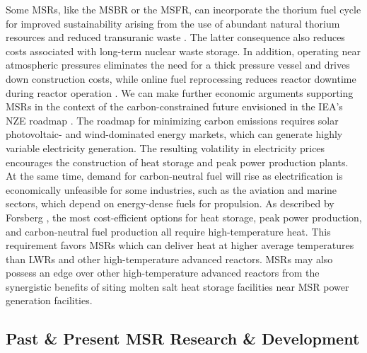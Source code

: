 Some \glspl{MSR}, like the \gls{MSBR} or the \gls{MSFR}, can
incorporate the thorium fuel cycle for improved sustainability arising from the
use of abundant natural thorium resources and reduced transuranic waste
\cite{heuer_towards_2014}. The latter consequence also reduces costs
associated with long-term nuclear waste storage. In addition, operating
near atmospheric pressures eliminates the need for a thick pressure
vessel and drives down construction costs, while online fuel reprocessing
reduces reactor downtime during reactor operation \cite{dolan_1_2017}.
We can make further economic arguments supporting \glspl{MSR} in the context of the
carbon-constrained future envisioned in the \gls{IEA}'s \gls{NZE} roadmap
\cite{iea_net_2021}. The roadmap for minimizing carbon emissions requires solar photovoltaic- and
wind-dominated energy markets, which can generate highly variable electricity generation. The
resulting volatility in electricity prices
encourages the construction of heat storage and peak power
production plants. At the same time, demand for carbon-neutral
fuel will rise as electrification is economically unfeasible
for some industries, such as the aviation and marine sectors, which depend on
energy-dense fuels for propulsion. As described by Forsberg
\cite{forsberg_market_2020}, the most cost-efficient options for heat storage, peak power
production, and carbon-neutral fuel production all require high-temperature heat.
This requirement favors \glspl{MSR} which can deliver heat at higher average
temperatures than \glspl{LWR} and other high-temperature advanced reactors.
\glspl{MSR} may also possess an edge over other high-temperature advanced reactors from the
synergistic benefits of siting molten salt heat storage facilities near \gls{MSR} power generation
facilities.

\subsection{Past \& Present \gls{MSR} Research \& Development}

